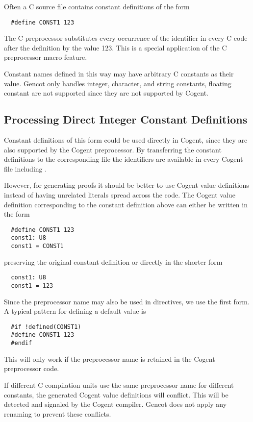 Often a C source file contains constant definitions of the form
\begin{verbatim}
  #define CONST1 123
\end{verbatim}
The C preprocessor substitutes every occurrence of the identifier  in every C code after the definition 
by the value 123. This is a special application of the C preprocessor macro feature.

Constant names defined in this way may have arbitrary C constants as their value. Gencot only handles integer,
character, and string constants, floating constant are not supported since they are not supported by Cogent.

\subsection{Processing Direct Integer Constant Definitions}

Constant definitions of this form could be used directly in Cogent, since they are also supported by the Cogent preprocessor.
By transferring the constant definitions to the corresponding file  the identifiers are available
in every Cogent file including . 

However, for generating proofs it should be better to use Cogent value definitions instead of having unrelated 
literals spread across the code. The Cogent value definition corresponding to the constant definition above can either 
be written in the form
\begin{verbatim}
  #define CONST1 123
  const1: U8
  const1 = CONST1
\end{verbatim}
preserving the original constant definition or directly in the shorter form
\begin{verbatim}
  const1: U8
  const1 = 123
\end{verbatim}
Since the preprocessor name  may also be used in  directives, we use the first form. A typical pattern 
for defining a default value is
\begin{verbatim}
  #if !defined(CONST1)
  #define CONST1 123
  #endif
\end{verbatim}
This will only work if the preprocessor name is retained in the Cogent preprocessor code.

If different C compilation units use the same preprocessor name for different constants, the generated Cogent value definitions
will conflict. This will be detected and signaled by the Cogent compiler. Gencot does not apply any renaming to prevent these
conflicts.

